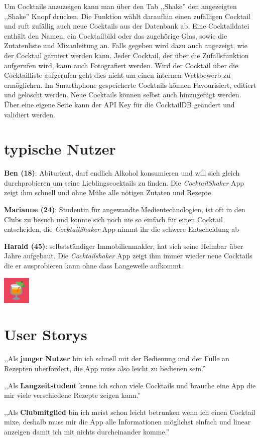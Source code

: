 \documentclass[a4paper, 10pt]{article}
\begin{document}
\begin{multicols}{2}
    Um Cocktails anzuzeigen kann man über den Tab ,,Shake'' den angezeigten ,,Shake'' Knopf drücken. Die Funktion wählt daraufhin einen zufälligen Cocktail und ruft zufällig auch neue Cocktails aus der Datenbank ab. Eine Cocktaildatei enthält den Namen, ein Cocktailbild oder das zugehörige Glas, sowie die Zutatenliste und Mixanleitung an. Falls gegeben wird dazu auch angezeigt, wie der Cocktail garniert werden kann.
    Jeder Cocktail, der über die Zufallsfunktion aufgerufen wird, kann auch Fotografiert werden. Wird der Cocktail über die Cocktailliste aufgerufen geht dies nicht um einen internen Wettbewerb zu ermöglichen. 
    Im Smarthphone gespeicherte Cocktails können Favourisiert, editiert und gelöscht werden. Neue Cocktails können selbst auch hinzugefügt werden.
    Über eine eigene Seite kann der API Key für die CocktailDB geändert und validiert werden.

    \columnbreak

    \section{typische Nutzer}
    \textbf{Ben (18)}: Abiturient, darf endlich Alkohol konsumieren und will sich gleich durchprobieren um seine Lieblingscocktails zu finden. Die \textit{CocktailShaker} App zeigt ihm schnell und ohne Mühe alle nötigen Zutaten und Rezepte.
    \bigskip

    \noindent\textbf{Marianne (24)}: Studentin für angewandte Medientechnologien, ist oft in den Clubs zu besuch und konnte sich noch nie so einfach für einen Cocktail entscheiden, die \textit{CocktailShaker} App nimmt ihr die schwere Entscheidung ab
    \bigskip

    \noindent\textbf{Harald (45)}: selbstständiger Immobilienmakler, hat sich seine Heimbar über Jahre aufgebaut. Die \textit{Cocktailshaker} App zeigt ihm immer wieder neue Cocktails die er ausprobieren kann ohne dass Langeweile aufkommt.

        \begin{center}
    \includegraphics[width=50px]{icon.png}
        \end{center}

    \section{User Storys}
    ,,Als \textbf{junger Nutzer} bin ich schnell mit der Bedienung und der Fülle an Rezepten überfordert, die App muss also leicht zu bedienen sein.''
    \bigskip

    \noindent ,,Als \textbf{Langzeitstudent} kenne ich schon viele Cocktails und brauche eine App die mir viele verschiedene Rezepte zeigen kann.''
    \bigskip

    \noindent ,,Als \textbf{Clubmitglied} bin ich meist schon leicht betrunken wenn ich einen Cocktail mixe, deshalb muss mir die App alle Informationen möglichst einfach und linear anzeigen damit ich mit nichts durcheinander komme.''

\end{multicols}
\end{document}
